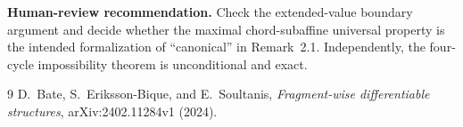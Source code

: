 \documentclass[11pt]{article}
\begin{document}
\textbf{Human-review recommendation.}  Check the extended-value boundary
argument and decide whether the maximal chord-subaffine universal property is
the intended formalization of ``canonical'' in Remark~2.1.  Independently,
the four-cycle impossibility theorem is unconditional and exact.

\begin{thebibliography}{9}
D.~Bate, S.~Eriksson-Bique, and E.~Soultanis,
\emph{Fragment-wise differentiable structures}, arXiv:2402.11284v1 (2024).
\end{thebibliography}
\end{document}
